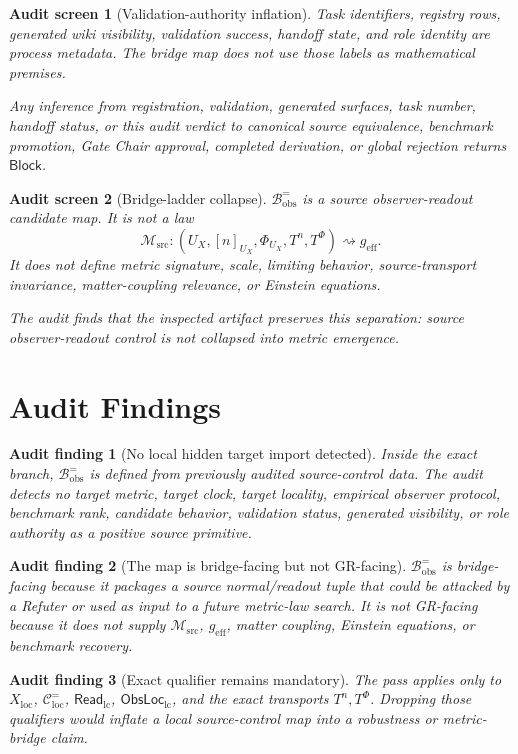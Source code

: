 \documentclass[11pt]{article}
\newcommand{\ReadLC}{\mathsf{Read}_{\mathrm{lc}}}
\newcommand{\ObsLocLC}{\mathsf{ObsLoc}_{\mathrm{lc}}}
\newcommand{\Bobs}{\mathcal{B}^{=}_{\mathrm{obs}}}
\newcommand{\Msrc}{\mathcal{M}_{\mathrm{src}}}
\newcommand{\geff}{g_{\mathrm{eff}}}
\newcommand{\Block}{\mathsf{Block}}
\newtheorem{screen}{Audit screen}
\newtheorem{auditfinding}{Audit finding}
\begin{document}
\begin{screen}[Validation-authority inflation]
Task identifiers, registry rows, generated wiki visibility, validation
success, handoff state, and role identity are process metadata. The
bridge map does not use those labels as mathematical premises.

Any inference from registration, validation, generated surfaces, task
number, handoff status, or this audit verdict to canonical source
equivalence, benchmark promotion, Gate Chair approval, completed
derivation, or global rejection returns \(\Block\).
\end{screen}

\begin{screen}[Bridge-ladder collapse]
\(\Bobs\) is a source observer-readout candidate map. It is not a law
\[
    \Msrc:
    (U_X,[n]_{U_X},\Phi_{U_X},T^n,T^\Phi)
    \rightsquigarrow
    \geff.
\]
It does not define metric signature, scale, limiting behavior,
source-transport invariance, matter-coupling relevance, or Einstein
equations.

The audit finds that the inspected artifact preserves this separation:
source observer-readout control is not collapsed into metric
emergence.
\end{screen}

\section{Audit Findings}

\begin{auditfinding}[No local hidden target import detected]
Inside the exact branch, \(\Bobs\) is defined from previously audited
source-control data. The audit detects no target metric, target clock,
target locality, empirical observer protocol, benchmark rank,
candidate behavior, validation status, generated visibility, or role
authority as a positive source primitive.
\end{auditfinding}

\begin{auditfinding}[The map is bridge-facing but not GR-facing]
\(\Bobs\) is bridge-facing because it packages a source normal/readout
tuple that could be attacked by a Refuter or used as input to a future
metric-law search. It is not GR-facing because it does not supply
\(\Msrc\), \(\geff\), matter coupling, Einstein equations, or
benchmark recovery.
\end{auditfinding}

\begin{auditfinding}[Exact qualifier remains mandatory]
The pass applies only to \(X_{\mathrm{loc}}\),
\(\mathcal{C}^{=}_{\mathrm{loc}}\), \(\ReadLC\), \(\ObsLocLC\), and
the exact transports \(T^n,T^\Phi\). Dropping those qualifiers would
inflate a local source-control map into a robustness or metric-bridge
claim.
\end{auditfinding}
\end{document}
